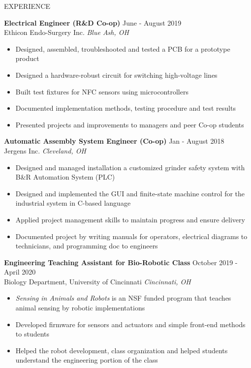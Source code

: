 \documentclass{resume} %
\begin{document}
	\begin{rSection}{EXPERIENCE}
		
		\textbf{Electrical Engineer (R\&D Co-op)} \hfill June - August 2019\\
		Ethicon Endo-Surgery Inc. \hfill \textit{Blue Ash, OH}
		\begin{itemize}
			\itemsep -4pt {} 
			\item Designed, assembled, troubleshooted and tested a PCB for a prototype product
			\item Designed a hardware-robust circuit for switching high-voltage lines
			\item Built test fixtures for NFC sensors using microcontrollers
			\item Documented implementation methods, testing procedure and test results
			\item Presented projects and improvements to managers and peer Co-op students
		\end{itemize}
		
		\textbf{Automatic Assembly System Engineer (Co-op)} \hfill Jan - August 2018
		\\	Jergens Inc. \hfill \textit{Cleveland, OH}
		\begin{itemize}
			\itemsep -4pt {} 
			\item Designed and managed installation a customized grinder safety system with B\&R Automation System (PLC)
			\item Designed and implemented the GUI and finite-state machine control for the industrial system in C-based language
			\item Applied project management skills to maintain progress and ensure delivery
			\item Documented project by writing manuals for operators, electrical diagrams to technicians, and programming doc to engineers
		\end{itemize}
		
		
		\textbf{Engineering Teaching Assistant for Bio-Robotic Class} \hfill October 2019 - April 2020\\
		Biology Department, University of Cincinnati \hfill \textit{Cincinnati, OH}
		\begin{itemize}
			\itemsep -4pt {} 
			\item \textit{Sensing in Animals and Robots} is an NSF funded program that teaches animal sensing by robotic implementations
			\item Developed firmware for sensors and actuators and simple front-end methods to students
			\item Helped the robot development, class organization and helped students understand the engineering portion of the class
			
		\end{itemize}
	\end{rSection} 
	
\end{document}
